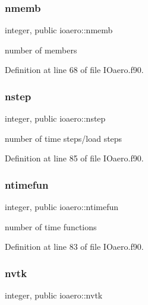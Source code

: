 \mbox{\label{namespaceioaero_ab59096c14b19d71fd53523822067402c}} 
\subsubsection{\texorpdfstring{nmemb}{nmemb}}
{\footnotesize\ttfamily integer, public ioaero\+::nmemb}



number of members 



Definition at line 68 of file I\+Oaero.\+f90.

\mbox{\label{namespaceioaero_ab078a397454a22b07a19ae3a7443a561}} 
\subsubsection{\texorpdfstring{nstep}{nstep}}
{\footnotesize\ttfamily integer, public ioaero\+::nstep}



number of time steps/load steps 



Definition at line 85 of file I\+Oaero.\+f90.

\mbox{\label{namespaceioaero_a8d0cfe1f4a5677d76ba3f3e775b12d1e}} 
\subsubsection{\texorpdfstring{ntimefun}{ntimefun}}
{\footnotesize\ttfamily integer, public ioaero\+::ntimefun}



number of time functions 



Definition at line 83 of file I\+Oaero.\+f90.

\mbox{\label{namespaceioaero_a29c506d8ad3a3609366b35e7e4c00fa4}} 
\subsubsection{\texorpdfstring{nvtk}{nvtk}}
{\footnotesize\ttfamily integer, public ioaero\+::nvtk}



